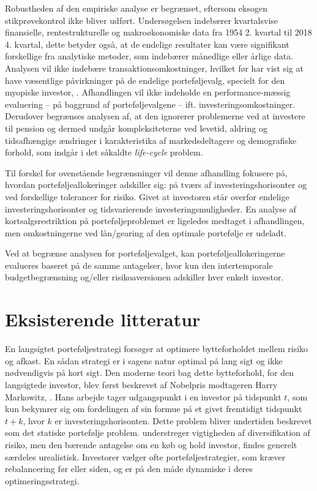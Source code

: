 \documentclass[
  a4paper,
  oneside]{memoir}
\begin{document}
Robustheden af den empiriske analyse er begrænset, eftersom eksogen stikprøvekontrol ikke bliver udført. Undersøgelsen indebærer kvartalsvise finansielle, rentestrukturelle og makroøkonomiske data fra 1954 2. kvartal til 2018 4. kvartal, dette betyder også, at de endelige resultater kan være signifikant forskellige fra analytiske metoder, som indebærer månedlige eller årlige data. Analysen vil ikke indebære transaktionsomkostninger, hvilket før har vist sig at have væsentlige påvirkninger på de endelige porteføljevalg, specielt for den myopiske investor, \citep{BalLyn1999}. Afhandlingen vil ikke indeholde en performance-mæssig evaluering -- på baggrund af porteføljevalgene -- ift. investeringsomkostninger. Derudover begrænses analysen af, at den ignorerer problemerne ved at investere til pension og dermed undgår kompleksiteterne ved levetid, aldring og tidsafhængige ændringer i karakteristika af markedsdeltagere og demografiske forhold, som indgår i det såkaldte \emph{life-cycle} problem.

Til forskel for ovenstående begrænsninger vil denne afhandling fokusere på, hvordan porteføljeallokeringer adskiller sig: på tværs af investeringshorisonter og ved forskellige tolerancer for risiko. Givet at investoren står overfor endelige investeringshorisonter og tidsvarierende investeringsmuligheder.
En analyse af kortsalgsrestriktion på porteføljeproblemet er ligeledes medtaget i afhandlingen, men omkostningerne ved lån/gearing af den optimale portefølje er udeladt.

Ved at begrænse analysen for porteføljevalget, kan porteføljeallokeringerne evalueres baseret på de samme antagelser, hvor kun den intertemporale budgetbegrænsning og/eller risikoaversionen adskiller hver enkelt investor.

\hypertarget{eksisterende-litteratur}{%
\section{Eksisterende litteratur}\label{eksisterende-litteratur}}

En langsigtet porteføljestrategi forsøger at optimere bytteforholdet mellem risiko og afkast. En sådan strategi er i sagens natur optimal på lang sigt og ikke nødvendigvis på kort sigt. Den moderne teori bag dette bytteforhold, for den langsigtede investor, blev først beskrevet af Nobelpris modtageren Harry Markowitz, \citep{Markowitz1952}. Hans arbejde tager udgangspunkt i en investor på tidspunkt \(t\), som kun bekymrer sig om fordelingen af sin formue på et givet fremtidigt tidspunkt \(t+k\), hvor \(k\) er investeringshorisonten. Dette problem bliver undertiden beskrevet som det statiske portefølje problem. \citep{Markowitz1952} understreger vigtigheden af diversifikation af risiko, men den bærende antagelse om en køb og hold investor, findes generelt særdeles urealistisk. Investorer vælger ofte porteføljestrategier, som kræver rebalancering før eller siden, og er på den måde dynamiske i deres optimeringsstrategi.
\end{document}
